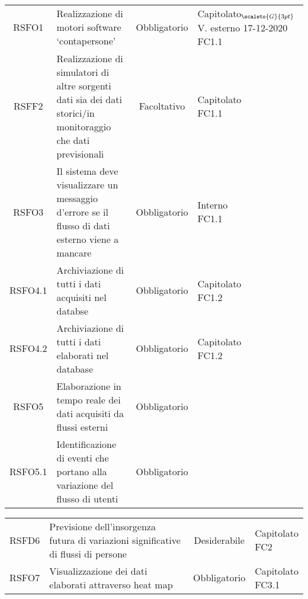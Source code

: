 \def\tabularxcolumn#1{m{#1}}
{
	
	\begin{center}
		\renewcommand{\arraystretch}{1.4}
		\begin{tabularx}{\textwidth}{ |c|X|c|X| }
			\hline
			\rowcolor{Melon}
			\makecell[c]{\textbf{Codice RS}} & \makecell[c]{\textbf{Descrizione}} & \makecell[c]{\textbf{Tipo di requisito}} & \makecell[c]{\textbf{Fonte}} \\
			\hline
			RSFO1 & Realizzazione di motori software ‘contapersone’  & Obbligatorio & \makecell[c]{Capitolato$_{\scaleto{G}{3pt}}$ \\ V. esterno 17-12-2020 \\ FC1.1} \\
			\hline
			RSFF2 & Realizzazione di simulatori di altre sorgenti dati sia dei dati storici/in monitoraggio che dati previsionali & Facoltativo & \makecell[c]{Capitolato \\ FC1.1} \\
			\hline
			RSFO3  & Il sistema deve visualizzare un messaggio d'errore se il flusso di dati esterno viene a mancare  & Obbligatorio & \makecell[c]{Interno\\FC1.1}  \\
			\hline
			RSFO4.1 & Archiviazione di tutti i dati acquisiti nel databse & Obbligatorio & \makecell[c]{Capitolato \\ FC1.2}  \\
			\hline
			RSFO4.2 & Archiviazione di tutti i dati elaborati nel database & Obbligatorio & \makecell[c]{Capitolato \\ FC1.2}  \\
			\hline
			RSFO5 & Elaborazione in tempo reale dei dati acquisiti da flussi esterni & Obbligatorio & \makecell[c]{Capitolato}  \\
			\hline
			RSFO5.1 & Identificazione di eventi che portano alla variazione del flusso di utenti & Obbligatorio & \makecell[c]{Capitolato}  \\
			\hline
				\end{tabularx}
		\end{center}
		\begin{center}
		\renewcommand{\arraystretch}{1.4}
		\begin{tabularx}{\textwidth}{ |c|X|c|X| }
			\hline
			\rowcolor{Melon}
			\makecell[c]{\textbf{Codice RS}} & \makecell[c]{\textbf{Descrizione}} & \makecell[c]{\textbf{Tipo di requisito}} & \makecell[c]{\textbf{Fonte}} \\
			\hline
			RSFD6 & Previsione dell'insorgenza futura di variazioni significative di flussi di persone & Desiderabile & \makecell[c]{Capitolato \\ FC2}  \\
			\hline
			RSFO7 & Visualizzazione dei dati elaborati attraverso heat map & Obbligatorio & \makecell[c]{Capitolato \\ FC3.1}  \\
		\hline
		


\end{tabularx}
\end{center}}
